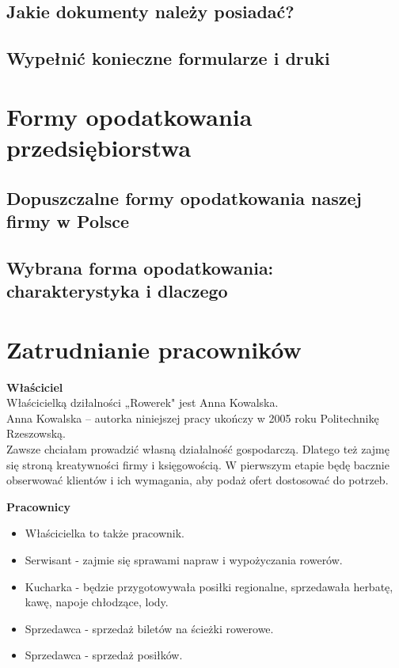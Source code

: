 \documentclass{sprawozdanie-agh}
\begin{document}
		\subsection{Jakie dokumenty należy posiadać?}
		\subsection{Wypełnić konieczne formularze i druki}

	\section{Formy opodatkowania przedsiębiorstwa}

		\subsection{Dopuszczalne formy opodatkowania naszej firmy w Polsce}
		\subsection{Wybrana forma opodatkowania: charakterystyka i dlaczego}

	\section{Zatrudnianie pracowników}

		\textbf{Właściciel}\\
		Właścicielką dziłalności „Rowerek" jest Anna Kowalska.\\
		Anna Kowalska – autorka niniejszej pracy ukończy w 2005 roku Politechnikę Rzeszowską. \\
		Zawsze chciałam prowadzić własną działalność gospodarczą. Dlatego też zajmę się stroną kreatywności firmy i księgowością. W pierwszym etapie będę bacznie obserwować klientów i ich wymagania, aby podaż ofert dostosować do potrzeb.
		
		\textbf{Pracownicy}
		\begin{itemize}
		\item Właścicielka to także pracownik.
		\item Serwisant - zajmie się sprawami napraw i wypożyczania rowerów.
		\item Kucharka - będzie przygotowywała posiłki regionalne, sprzedawała herbatę, kawę, napoje chłodzące, lody.
		\item Sprzedawca - sprzedaż biletów na ścieżki rowerowe.
		\item Sprzedawca - sprzedaż posiłków.
		\end{itemize}
	
\end{document}
